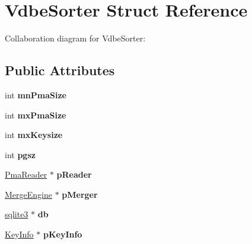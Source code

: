 \hypertarget{struct_vdbe_sorter}{\section{Vdbe\+Sorter Struct Reference}
\label{struct_vdbe_sorter}
}


Collaboration diagram for Vdbe\+Sorter\+:
\subsection*{Public Attributes}
\begin{DoxyCompactItemize}
\item 
\hypertarget{struct_vdbe_sorter_a6d201d0f496260f7f2c7f450cae5898b}{int {\bfseries mn\+Pma\+Size}}\label{struct_vdbe_sorter_a6d201d0f496260f7f2c7f450cae5898b}

\item 
\hypertarget{struct_vdbe_sorter_ab23b8039f7b58052b6c6dfc32aa895ed}{int {\bfseries mx\+Pma\+Size}}\label{struct_vdbe_sorter_ab23b8039f7b58052b6c6dfc32aa895ed}

\item 
\hypertarget{struct_vdbe_sorter_a378f212fc0dc1eb53662fe9651c83e92}{int {\bfseries mx\+Keysize}}\label{struct_vdbe_sorter_a378f212fc0dc1eb53662fe9651c83e92}

\item 
\hypertarget{struct_vdbe_sorter_adf515e49daec945d414c95c5793d8b92}{int {\bfseries pgsz}}\label{struct_vdbe_sorter_adf515e49daec945d414c95c5793d8b92}

\item 
\hypertarget{struct_vdbe_sorter_ae5e5be145520adddd62d221dcdc1aa8e}{\hyperlink{struct_pma_reader}{Pma\+Reader} $\ast$ {\bfseries p\+Reader}}\label{struct_vdbe_sorter_ae5e5be145520adddd62d221dcdc1aa8e}

\item 
\hypertarget{struct_vdbe_sorter_a8771886d3d97de93fd786b4ec9f2c185}{\hyperlink{struct_merge_engine}{Merge\+Engine} $\ast$ {\bfseries p\+Merger}}\label{struct_vdbe_sorter_a8771886d3d97de93fd786b4ec9f2c185}

\item 
\hypertarget{struct_vdbe_sorter_a8289109b89d3798362e4edc596c3c887}{\hyperlink{structsqlite3}{sqlite3} $\ast$ {\bfseries db}}\label{struct_vdbe_sorter_a8289109b89d3798362e4edc596c3c887}

\item 
\hypertarget{struct_vdbe_sorter_a97c1a2aefd6dd093e82eddbf1bc9ffde}{\hyperlink{struct_key_info}{Key\+Info} $\ast$ {\bfseries p\+Key\+Info}}\label{struct_vdbe_sorter_a97c1a2aefd6dd093e82eddbf1bc9ffde}


\end{DoxyCompactItemize}
